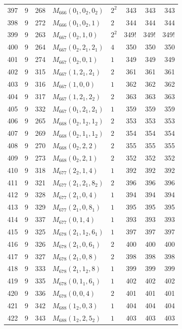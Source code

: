 \documentclass[11pt,a4paper]{article}
\begin{document}
\begin{longtable}{rrr|l|l|rrr}
397 & 9 & 268 & $M_{666}(0_1,0_2,0_2)$ & $2^2$ & 343 & 343 & 343\\
398 & 9 & 272 & $M_{666}(0_1,0_2,1)$ & $2$ & 344 & 344 & 344\\
399 & 9 & 263 & $M_{667}(0_2,1,0)$ & $2^2$ & 349! & 349! & 349!\\
400 & 9 & 264 & $M_{667}(0_2,2_1,2_1)$ & $4$ & 350 & 350 & 350\\
401 & 9 & 274 & $M_{667}(0_2,0,1)$ & $1$ & 349 & 349 & 349\\
402 & 9 & 315 & $M_{667}(1,2_1,2_1)$ & $2$ & 361 & 361 & 361\\
403 & 9 & 316 & $M_{667}(1,0,0)$ & $1$ & 362 & 362 & 362\\
404 & 9 & 317 & $M_{667}(1,2_1,2_2)$ & $2$ & 363 & 363 & 363\\
405 & 9 & 332 & $M_{667}(0_1,2_1,2_1)$ & $1$ & 359 & 359 & 359\\
406 & 9 & 265 & $M_{668}(0_2,1_2,1_2)$ & $2$ & 353 & 353 & 353\\
407 & 9 & 269 & $M_{668}(0_2,1_1,1_2)$ & $2$ & 354 & 354 & 354\\
408 & 9 & 270 & $M_{668}(0_2,2,2)$ & $2$ & 355 & 355 & 355\\
409 & 9 & 273 & $M_{668}(0_2,2,1)$ & $2$ & 352 & 352 & 352\\
410 & 9 & 318 & $M_{677}(2_2,1,4)$ & $1$ & 392 & 392 & 392\\
411 & 9 & 321 & $M_{677}(2_1,2_1,8_2)$ & $2$ & 396 & 396 & 396\\
412 & 9 & 328 & $M_{677}(2_1,0,4)$ & $1$ & 394 & 394 & 394\\
413 & 9 & 329 & $M_{677}(2_1,0,8_1)$ & $1$ & 395 & 395 & 395\\
414 & 9 & 337 & $M_{677}(0,1,4)$ & $1$ & 393 & 393 & 393\\
415 & 9 & 325 & $M_{678}(2_1,1_2,6_1)$ & $1$ & 397 & 397 & 397\\
416 & 9 & 326 & $M_{678}(2_1,0,6_1)$ & $2$ & 400 & 400 & 400\\
417 & 9 & 327 & $M_{678}(2_1,0,8)$ & $2$ & 398 & 398 & 398\\
418 & 9 & 333 & $M_{678}(2_1,1_2,8)$ & $1$ & 399 & 399 & 399\\
419 & 9 & 335 & $M_{678}(0,1_1,6_1)$ & $1$ & 402 & 402 & 402\\
420 & 9 & 336 & $M_{678}(0,0,4)$ & $2$ & 401 & 401 & 401\\
421 & 9 & 342 & $M_{688}(1_2,0,3)$ & $1$ & 404 & 404 & 404\\
422 & 9 & 343 & $M_{688}(1_2,2,5_2)$ & $1$ & 403 & 403 & 403\\

\end{longtable}
\end{document}
